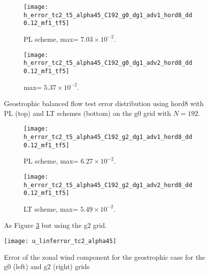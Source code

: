 \begin{figure}[!h]
	\centering
	\begin{subfigure}{0.6\textwidth}
		\centering
		\texttt{[image: h\_error\_tc2\_t5\_alpha45\_C192\_g0\_dg1\_adv1\_hord8\_dd0.12\_mf1\_tf5]}
		\caption{PL scheme, max= $7.03\times10^{-2}$.\label{chp-advcs-sec-exp-sw1-errors-0a}}
	\end{subfigure}
	\begin{subfigure}{0.6\textwidth}
		\centering
		\texttt{[image: h\_error\_tc2\_t5\_alpha45\_C192\_g0\_dg1\_adv2\_hord8\_dd0.12\_mf1\_tf5]}
		\caption{ max= $5.37\times10^{-2}$.\label{chp-advcs-sec-exp-sw1-errors-0b}}
	\end{subfigure}
	\caption{
		Geostrophic balanced flow test error distribution using hord8
		with PL (top) and LT schemes (bottom) on the g0 grid with $N=192$. 
		\label{chp-advcs-sec-exp-sw1-errors-0}}
\end{figure}
\newpage
\begin{figure}[!h]
	\centering
	\begin{subfigure}{0.6\textwidth}
		\centering
		\texttt{[image: h\_error\_tc2\_t5\_alpha45\_C192\_g2\_dg1\_adv1\_hord8\_dd0.12\_mf1\_tf5]}
		\caption{PL scheme,  max= $6.27\times10^{-2}$.\label{chp-advcs-sec-exp-sw1-errors-2a}}
	\end{subfigure}
	\begin{subfigure}{0.6\textwidth}
		\centering
		\texttt{[image: h\_error\_tc2\_t5\_alpha45\_C192\_g2\_dg1\_adv2\_hord8\_dd0.12\_mf1\_tf5]}
		\caption{LT scheme, max= $5.49\times10^{-2}$.\label{chp-advcs-sec-exp-sw1-errors-2b}}
	\end{subfigure}
	\caption{As Figure \ref{chp-advcs-sec-exp-sw1-errors-0} but using the g2 grid.\label{chp-advcs-sec-exp-sw1-errors-2}}
\end{figure}

\begin{figure}[!htb]
	\centering
	\texttt{[image: u\_linferror\_tc2\_alpha45]}
	\caption{Error of the zonal wind component for the geostrophic case for the g0 (left) and g2 (right) grids \label{chp-advcs-sec-exp-sw-l2}}
\end{figure}

